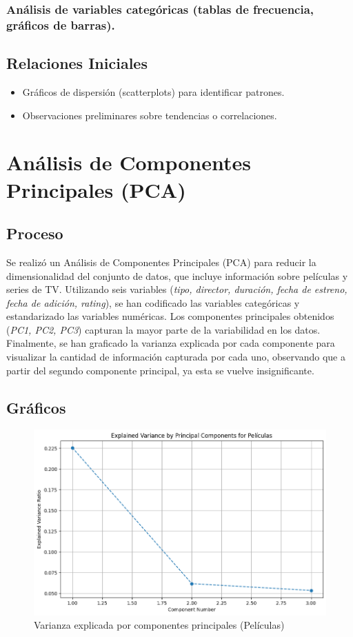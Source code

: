\documentclass{article}
\begin{document}
    \subsubsection{Análisis de variables categóricas (tablas de frecuencia, gráficos de barras).}

\subsection{Relaciones Iniciales}
\begin{itemize}
    \item Gráficos de dispersión (scatterplots) para identificar patrones.
    \item Observaciones preliminares sobre tendencias o correlaciones.
\end{itemize}

\section{Análisis de Componentes Principales (PCA)}
\subsection{Proceso}
Se realizó un Análisis de Componentes Principales (PCA) para reducir la dimensionalidad del conjunto de datos, que incluye información sobre películas y series de TV. Utilizando seis variables (\textit{tipo, director, duración, fecha de estreno, fecha de adición, rating}), se han codificado las variables categóricas y estandarizado las variables numéricas. Los componentes principales obtenidos (\textit{PC1, PC2, PC3}) capturan la mayor parte de la variabilidad en los datos. Finalmente, se han graficado la varianza explicada por cada componente para visualizar la cantidad de información capturada por cada uno, observando que a partir del segundo componente principal, ya esta se vuelve insignificante.
\subsection{Gráficos}
\begin{figure}[H]
    \centering
    \includegraphics[width=\textwidth]{Graphs/PC_peliculas.png}
    \caption{Varianza explicada por componentes principales (Películas)}
    \label{fig:PC_peliculas}
\end{figure}
\end{document}
